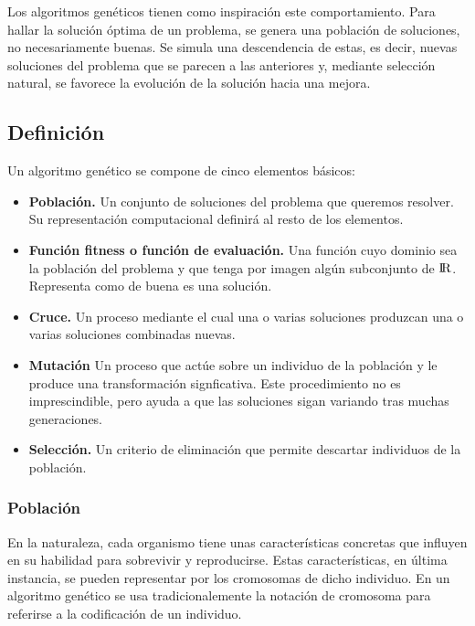 \documentclass[12pt,a4paper]{article}
\begin{document}
		Los algoritmos gen\'eticos tienen como inspiraci\'on este comportamiento. Para hallar la soluci\'on \'optima de un problema, se genera una poblaci\'on de soluciones, no necesariamente buenas. Se simula una descendencia de estas, es decir, nuevas soluciones del problema que se parecen a las anteriores y, mediante selecci\'on natural, se favorece la evoluci\'on de la soluci\'on hacia una mejora.
		
		\subsection{Definici\'on}
		Un algoritmo gen\'etico se compone de cinco elementos b\'asicos:
		
		\begin{itemize}
			\item \textbf{Poblaci\'on.} Un conjunto de soluciones del problema que queremos resolver. Su representaci\'on computacional definir\'a al resto de los elementos.
			\item \textbf{Funci\'on fitness o funci\'on de evaluaci\'on.} Una funci\'on cuyo dominio sea la poblaci\'on del problema y que tenga por imagen alg\'un subconjunto de ${\rm I\!R}$. Representa como de buena es una soluci\'on.
			\item \textbf{Cruce.} Un proceso mediante el cual una o varias soluciones produzcan una o varias soluciones combinadas nuevas.
			\item \textbf{Mutaci\'on} Un proceso que act\'ue sobre un individuo de la poblaci\'on y le produce una transformaci\'on signficativa. Este procedimiento no es imprescindible, pero ayuda a que las soluciones sigan variando tras muchas generaciones.
			\item \textbf{Selecci\'on.} Un criterio de eliminaci\'on que permite descartar individuos de la poblaci\'on.
		\end{itemize}
		
			\subsubsection{Poblaci\'on}
			En la naturaleza, cada organismo tiene unas caracter\'isticas concretas que influyen en su habilidad para sobrevivir y reproducirse. Estas caracter\'isticas, en  \'ultima instancia, se pueden representar por los cromosomas de dicho individuo. En un algoritmo gen\'etico se usa tradicionalemente la notaci\'on de cromosoma para referirse a la codificaci\'on de un individuo.\\
			
\end{document}
